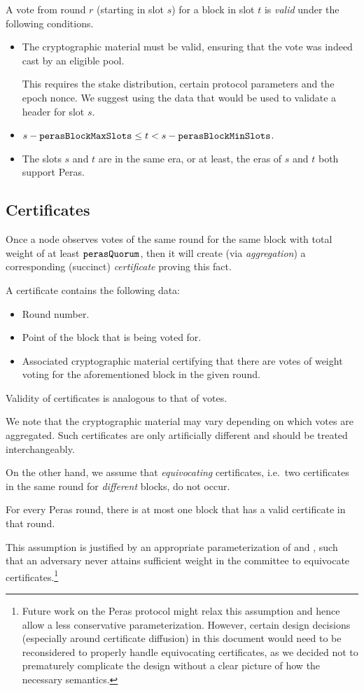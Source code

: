 A vote from round $r$ (starting in slot $s$) for a block in slot $t$ is \emph{valid} under the following conditions.
\begin{itemize}
\item
  The cryptographic material must be valid, ensuring that the vote was indeed cast by an eligible pool.

  This requires the stake distribution, certain protocol parameters and the epoch nonce.
  We suggest using the data that would be used to validate a header for slot $s$.
\item
  $s - \mathtt{perasBlockMaxSlots} \le t < s - \mathtt{perasBlockMinSlots}$.
\item
  The slots $s$ and $t$ are in the same era, or at least, the eras of $s$ and $t$ both support Peras.
\end{itemize}

\subsection{Certificates}

Once a node observes votes of the same round for the same block with total weight of at least $\mathtt{perasQuorum}$, then it will create (via \emph{aggregation}) a corresponding (succinct) \emph{certificate} proving this fact.

A certificate contains the following data:
\begin{itemize}
\item Round number.
\item Point of the block that is being voted for.
\item Associated cryptographic material certifying that there are votes of weight \perasQuorum{} voting for the aforementioned block in the given round.
\end{itemize}

Validity of certificates is analogous to that of votes.

We note that the cryptographic material may vary depending on which votes are aggregated.
Such certificates are only artificially different and should be treated interchangeably.

On the other hand, we assume that \emph{equivocating} certificates, i.e.\ two certificates in the same round for \emph{different} blocks, do not occur.
\begin{tcolorbox}[title=Assumption]
  For every Peras round, there is at most one block that has a valid certificate in that round.
\end{tcolorbox}
This assumption is justified by an appropriate parameterization of \perasQuorum{} and \perasN{}, such that an adversary never attains sufficient weight in the committee to equivocate certificates.\footnote{Future work on the Peras protocol might relax this assumption and hence allow a less conservative parameterization.
  However, certain design decisions (especially around certificate diffusion) in this document would need to be reconsidered to properly handle equivocating certificates, as we decided not to prematurely complicate the design without a clear picture of how the necessary semantics.}

